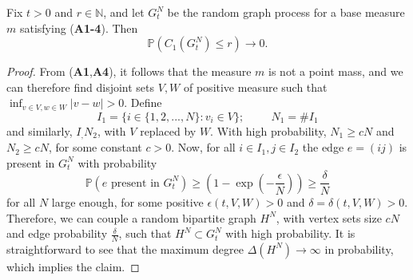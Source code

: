 \begin{lemma}\label{lemma: lower bound on largest cluster} Fix $t>0$ and $r\in \mathbb{N}$, and let $G^N_t$ be the random graph process for a base measure $m$ satisfying (\textbf{A1-4}). Then \begin{equation}
    \mathbb{P}(C_1(G^N_t)\leq r)\rightarrow 0.
\end{equation} \end{lemma} \begin{proof} From (\textbf{A1},\textbf{A4}), it follows that the measure $m$ is not a point mass, and we can therefore find disjoint sets $V, W$ of positive measure such that $\inf_{v \in V, w \in W} |v-w|>0$. Define \begin{equation} I_1=\{i \in \{1,2,...,N\}: v_i \in V\}; \hspace{1cm} N_1=\#I_1
\end{equation} and similarly, $I_, N_2$, with $V$ replaced by $W$. With high probability, $N_1\geq cN$ and $N_2\geq cN$, for some constant $c>0$. Now, for all $i\in I_1, j\in I_2$ the edge $e=(ij)$ is present in $G^N_t$ with probability \begin{equation}
    \mathbb{P}(e \text{ present in }G^N_t) \geq \left(1-\exp\left(-\frac{\epsilon}{N}\right)\right) \geq \frac{\delta}{N}
\end{equation} for all $N$ large enough, for some positive $\epsilon(t, V, W)>0$ and $\delta=\delta(t, V, W)>0$. \medskip \\ Therefore, we can couple a random bipartite graph $H^N$, with vertex sets size $cN$ and edge probability $\frac{\delta}{N}$, such that $H^N \subset G^N_t$ with high probability. It is straightforward to see that the maximum degree $\Delta(H^N)\rightarrow \infty$ in probability, which implies the claim.   \end{proof}

